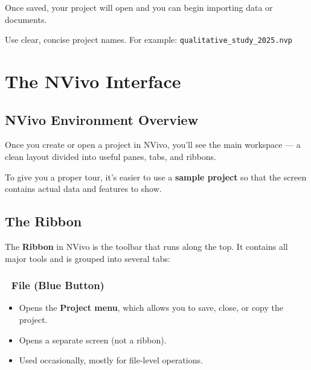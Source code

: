 \documentclass[
  letterpaper,
  DIV=11,
  numbers=noendperiod]{scrreprt}
\providecommand{\tightlist}{%
  \setlength{\itemsep}{0pt}\setlength{\parskip}{0pt}}\usepackage{longtable,booktabs,array}
\begin{document}
Once saved, your project will open and you can begin importing data or
documents.

\begin{tcolorbox}[enhanced jigsaw, breakable, left=2mm, colback=white, bottomrule=.15mm, colbacktitle=quarto-callout-tip-color!10!white, leftrule=.75mm, title=\textcolor{quarto-callout-tip-color}{\faLightbulb}\hspace{0.5em}{Tip}, colframe=quarto-callout-tip-color-frame, coltitle=black, toptitle=1mm, opacitybacktitle=0.6, toprule=.15mm, titlerule=0mm, bottomtitle=1mm, arc=.35mm, rightrule=.15mm, opacityback=0]

Use clear, concise project names. For example:
\texttt{qualitative\_study\_2025.nvp}

\end{tcolorbox}

\chapter{The NVivo Interface}\label{the-nvivo-interface}

\section{NVivo Environment Overview}\label{nvivo-environment-overview}

Once you create or open a project in NVivo, you'll see the main
workspace --- a clean layout divided into useful panes, tabs, and
ribbons.

To give you a proper tour, it's easier to use a \textbf{sample project}
so that the screen contains actual data and features to show.

\section{The Ribbon}\label{the-ribbon}

The \textbf{Ribbon} in NVivo is the toolbar that runs along the top. It
contains all major tools and is grouped into several tabs:

\subsection{📁 File (Blue Button)}\label{file-blue-button}

\begin{itemize}
\tightlist
\item
  Opens the \textbf{Project menu}, which allows you to save, close, or
  copy the project.
\item
  Opens a separate screen (not a ribbon).
\item
  Used occasionally, mostly for file-level operations.
\end{itemize}
\end{document}
